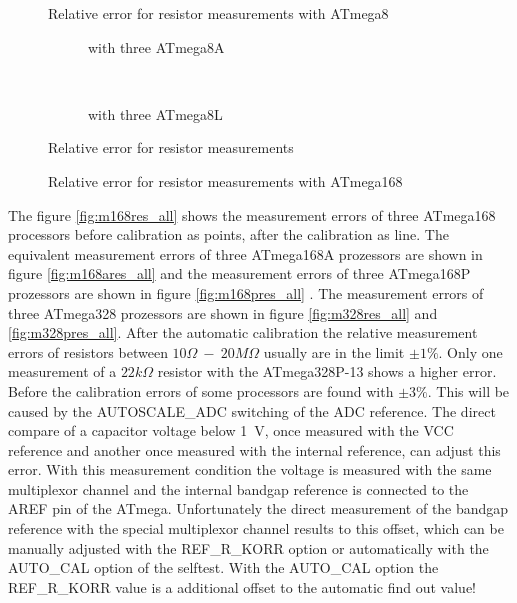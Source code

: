 \begin{figure}[H]
\centering

\caption{Relative error for resistor measurements with ATmega8 }
\label{fig:mega8res}
\end{figure}

\begin{figure}[H]
  \begin{subfigure}[b]{9cm}
    \centering
    \resizebox{9cm}{!}{}
    \caption{with three ATmega8A}
    \label{fig:mega8Ares}
  \end{subfigure}
  ~
  \begin{subfigure}[b]{9cm}
    \centering
    \resizebox{9cm}{!}{}
    \caption{with three ATmega8L}
    \label{fig:mega8Lres}
  \end{subfigure}
\caption{Relative error for resistor measurements}
\end{figure}


\begin{figure}[H]
\centering

\caption{Relative error for resistor measurements with ATmega168 }
\label{fig:mega168res}
\end{figure}

The figure \ref{fig:m168res_all} shows the measurement errors of three ATmega168 processors before calibration as points, after the
calibration as line. The equivalent measurement errors of three ATmega168A prozessors are shown in figure \ref{fig:m168ares_all} and
the measurement errors of three ATmega168P prozessors are shown in figure \ref{fig:m168pres_all} .
The measurement errors of three ATmega328 prozessors are shown in figure \ref{fig:m328res_all} and \ref{fig:m328pres_all}.
After the automatic calibration the relative measurement errors of resistors between \(10\Omega~-~20 M\Omega\) 
usually are in the limit \(\pm1\%\). Only one measurement of a \(22k\Omega\) resistor with the ATmega328P-13 shows 
a higher error.
Before the calibration errors of some processors are found with \(\pm3\%\).
This will be caused by the AUTOSCALE\_ADC switching of the ADC reference.
The direct compare of a capacitor voltage below 1~V, once measured with the VCC reference and another once measured with 
the internal reference, can adjust this error.
With this measurement condition the voltage is measured with the same multiplexor channel and the internal bandgap reference
is connected to the AREF pin of the ATmega.
Unfortunately the direct measurement of the bandgap reference with the special multiplexor channel results to this offset,
which can be manually adjusted with the REF\_R\_KORR option or automatically with the AUTO\_CAL option of the selftest.
With the AUTO\_CAL option the REF\_R\_KORR value is a additional offset to the automatic find out value!

